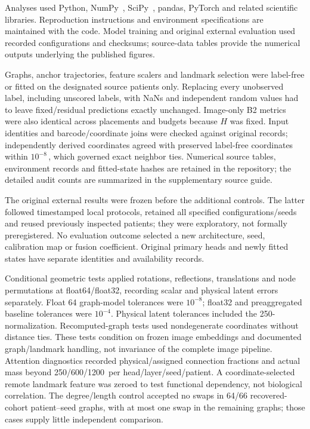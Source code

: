 Analyses used Python, NumPy~\cite{harris2020}, SciPy~\cite{virtanen2020}, pandas, PyTorch and related scientific libraries. Reproduction instructions and environment specifications are maintained with the code. Model training and original external evaluation used recorded configurations and checksums; source-data tables provide the numerical outputs underlying the published figures.

Graphs, anchor trajectories, feature scalers and landmark selection were label-free or fitted on the designated source patients only. Replacing every unobserved label, including unscored labels, with NaNs and independent random values had to leave fixed/residual predictions exactly unchanged. Image-only B2 metrics were also identical across placements and budgets because $H$ was fixed. Input identities and barcode/coordinate joins were checked against original records; independently derived coordinates agreed with preserved label-free coordinates within $10^{-8}$\,\um{}, which governed exact neighbor ties. Numerical source tables, environment records and fitted-state hashes are retained in the repository; the detailed audit counts are summarized in the supplementary source guide.

The original external results were frozen before the additional controls. The latter followed timestamped local protocols, retained all specified configurations/seeds and reused previously inspected patients; they were exploratory, not formally preregistered. No evaluation outcome selected a new architecture, seed, calibration map or fusion coefficient. Original primary heads and newly fitted states have separate identities and availability records.

Conditional geometric tests applied rotations, reflections, translations and node permutations at float64/float32, recording scalar and physical latent errors separately. Float 64 graph-model tolerances were $10^{-8}$; float32 and preaggregated baseline tolerances were $10^{-4}$. Physical latent tolerances included the 250-\um{} normalization. Recomputed-graph tests used nondegenerate coordinates without distance ties. These tests condition on frozen image embeddings and documented graph/landmark handling, not invariance of the complete image pipeline. Attention diagnostics recorded physical/assigned connection fractions and actual mass beyond 250/600/1200\,\um{} per head/layer/seed/patient. A coordinate-selected remote landmark feature was zeroed to test functional dependency, not biological correlation. The degree/length control accepted no swaps in 64/66 recovered-cohort patient--seed graphs, with at most one swap in the remaining graphs; those cases supply little independent comparison.

